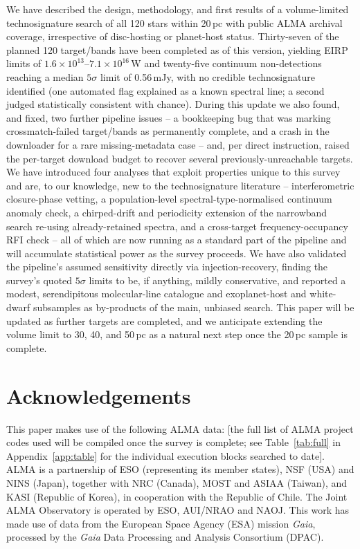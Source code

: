\documentclass{openjournal}
\begin{document}
We have described the design, methodology, and first results of a
volume-limited technosignature search of all 120 stars within 20\,pc
with public ALMA archival coverage, irrespective of disc-hosting or
planet-host status. Thirty-seven of the planned 120 target/bands have been
completed as of this version, yielding EIRP limits of
$1.6\times10^{13}$--$7.1\times10^{16}$\,W and twenty-five continuum
non-detections reaching a median $5\sigma$ limit of 0.56\,mJy, with no
credible technosignature identified (one automated flag explained as a
known spectral line; a second judged statistically consistent with
chance). During this update we also found, and fixed, two further
pipeline issues -- a bookkeeping bug that was marking crossmatch-failed
target/bands as permanently complete, and a crash in the downloader for
a rare missing-metadata case -- and, per direct instruction, raised the
per-target download budget to recover several previously-unreachable
targets. We have introduced four analyses
that exploit properties unique to this survey and are, to our knowledge,
new to the technosignature literature -- interferometric closure-phase
vetting, a population-level spectral-type-normalised continuum anomaly
check, a chirped-drift and periodicity extension of the narrowband
search re-using already-retained spectra, and a cross-target
frequency-occupancy RFI check -- all of which are now running as a
standard part of the pipeline and will accumulate statistical power as
the survey proceeds. We have also validated the pipeline's assumed
sensitivity directly via injection-recovery, finding the survey's
quoted $5\sigma$ limits to be, if anything, mildly conservative, and
reported a modest, serendipitous molecular-line catalogue and
exoplanet-host and white-dwarf subsamples as by-products of the main,
unbiased search. This paper will be updated as further targets are
completed, and we anticipate extending the volume limit to 30, 40, and
50\,pc as a natural next step once the 20\,pc sample is complete.

\section*{Acknowledgements}
This paper makes use of the following ALMA data: [the full list of ALMA
project codes used will be compiled once the survey is complete; see
Table~\ref{tab:full} in Appendix~\ref{app:table} for the individual
execution blocks searched to date]. ALMA is a partnership of ESO
(representing its member states), NSF (USA) and NINS (Japan), together with NRC
(Canada), MOST and ASIAA (Taiwan), and KASI (Republic of Korea), in cooperation
with the Republic of Chile. The Joint ALMA Observatory is operated by ESO,
AUI/NRAO and NAOJ. This work has made use of data from the European Space
Agency (ESA) mission {\it Gaia}, processed by the {\it Gaia} Data Processing and
Analysis Consortium (DPAC).
\end{document}
